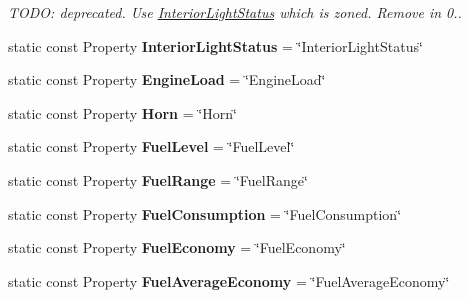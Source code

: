 \begin{DoxyCompactItemize}
\begin{DoxyCompactList}\small\item\em T\+O\+D\+O\+: deprecated. Use \hyperlink{interfaceInteriorLightStatus}{Interior\+Light\+Status} which is zoned. Remove in 0.. \end{DoxyCompactList}\item 
\hypertarget{classVehicleProperty_ade55fb4bc0d20e5825f7d50b73ec6488}{static const Property {\bfseries Interior\+Light\+Status} = \char`\"{}Interior\+Light\+Status\char`\"{}}\label{classVehicleProperty_ade55fb4bc0d20e5825f7d50b73ec6488}

\item 
\hypertarget{classVehicleProperty_a89cb1e6e8dcb7910270c333d79200665}{static const Property {\bfseries Engine\+Load} = \char`\"{}Engine\+Load\char`\"{}}\label{classVehicleProperty_a89cb1e6e8dcb7910270c333d79200665}

\item 
\hypertarget{classVehicleProperty_a69370e86d3520734d83a4c154b533642}{static const Property {\bfseries Horn} = \char`\"{}Horn\char`\"{}}\label{classVehicleProperty_a69370e86d3520734d83a4c154b533642}

\item 
\hypertarget{classVehicleProperty_a9bfbe5beb9e13c8de62c7514b3b22fc9}{static const Property {\bfseries Fuel\+Level} = \char`\"{}Fuel\+Level\char`\"{}}\label{classVehicleProperty_a9bfbe5beb9e13c8de62c7514b3b22fc9}

\item 
\hypertarget{classVehicleProperty_ae0c98c8cbfb6b8553faabfb9d4a42b35}{static const Property {\bfseries Fuel\+Range} = \char`\"{}Fuel\+Range\char`\"{}}\label{classVehicleProperty_ae0c98c8cbfb6b8553faabfb9d4a42b35}

\item 
\hypertarget{classVehicleProperty_afdc1b7b9ecf211d26221b155aef9a35a}{static const Property {\bfseries Fuel\+Consumption} = \char`\"{}Fuel\+Consumption\char`\"{}}\label{classVehicleProperty_afdc1b7b9ecf211d26221b155aef9a35a}

\item 
\hypertarget{classVehicleProperty_af34bb142d87eb300ce82e112598d5376}{static const Property {\bfseries Fuel\+Economy} = \char`\"{}Fuel\+Economy\char`\"{}}\label{classVehicleProperty_af34bb142d87eb300ce82e112598d5376}

\item 
\hypertarget{classVehicleProperty_aa453a0e6b9edee8da30b1f5b9a32edeb}{static const Property {\bfseries Fuel\+Average\+Economy} = \char`\"{}Fuel\+Average\+Economy\char`\"{}}\label{classVehicleProperty_aa453a0e6b9edee8da30b1f5b9a32edeb}


\end{DoxyCompactItemize}
